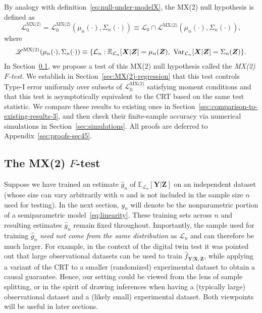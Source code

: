 \documentclass[12pt]{article}
\theoremstyle{definition}
\theoremstyle{remark}
\newcommand{\prx}{\bm X}
\newcommand{\prz}{\bm Z}
\newcommand{\pry}{{\bm Y}}
\begin{document}
By analogy with definition~\eqref{eq:null-under-modelX}, the MX(2) null hypothesis is defined as 
\begin{equation}
	\mathscr L_0^{\text{MX(2)}} = \mathscr L_0^{\text{MX(2)}}(\mu_n(\cdot), \Sigma_n(\cdot)) \equiv \mathscr L_{0} \cap \mathscr L^{\text{MX(2)}}(\mu_n(\cdot), \Sigma_n(\cdot)),
	\label{mx2-null}
\end{equation}
where
\begin{equation*}
	\begin{split}
		\mathscr L^{\textnormal{MX(2)}}(\mu_n(\cdot), \Sigma_n(\cdot)) \equiv \{\mathcal L_n: \mathbb E_{\mathcal L_n}[\prx|\prz] = \mu_n(\prz),\ \text{Var}_{\mathcal L_n}[\prx|\prz] = \Sigma_n(\prz)\}.
	\end{split}
\end{equation*}
In Section~\ref{sec:mx2-f-test}, we propose a test of this MX(2) null hypothesis called the \textit{MX(2) $F$-test}. We establish in Section~\ref{sec:MX(2)-regression} that this test controls Type-I error uniformly over subsets of $\mathscr L_0^{\text{MX(2)}}$ satisfying moment conditions and that this test is asymptotically equivalent to the CRT based on the same test statistic. We compare these results to existing ones in Section~\ref{sec:comparison-to-existing-results-3}, and then check their finite-sample accuracy via numerical simulations in Section~\ref{sec:simulations}. All proofs are deferred to Appendix~\ref{sec:proofs-sec45}.


\subsection{The MX(2) $F$-test} \label{sec:mx2-f-test}

Suppose we have trained an estimate $\widehat g_n$ of $\mathbb E_{\mathcal L_n}[\pry|\prz]$ on an independent dataset (whose size can vary arbitrarily with $n$ and is not included in the sample size $n$ used for testing). In the next section, $g_n$ will denote be the nonparametric portion of a semiparametric model~\eqref{eq:linearity}. These training sets across $n$ and resulting estimates $\widehat g_n$ remain fixed throughout. Importantly, the sample used for training $\widehat g_n$ \emph{need not come from the same distribution} as $\mathcal L_n$ and can therefore be much larger. For example, in the context of the digital twin test \cite{Bates2020} it was pointed out that large observational datasets can be used to train $\widehat f_{\pry|\prx,\prz}$, while applying a variant of the CRT to a smaller (randomized) experimental dataset to obtain a causal guarantee. Hence, our setting could be viewed from the lens of sample splitting, or in the spirit of drawing inferences when having a (typically large) observational dataset and a (likely small) experimental dataset. Both viewpoints will be useful in later sections.
\end{document}
